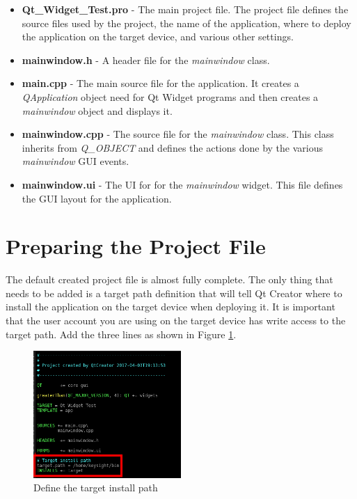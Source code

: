 \documentclass{article}
\begin{document}
\begin{itemize}
	\item \textbf{Qt\_Widget\_Test.pro} - The main project file. The project file defines the source files used by the project, the name of the application, where to deploy the application on the target device, and various other settings.
	
	\item \textbf{mainwindow.h} - A header file for the \textit{mainwindow} class. 
	
	\item \textbf{main.cpp} - The main source file for the application. It creates a \textit{QApplication} object need for Qt Widget programs and then creates a \textit{mainwindow} object and displays it.
	
	\item \textbf{mainwindow.cpp} - The source file for the \textit{mainwindow} class. This class inherits from \textit{Q\_OBJECT} and defines the actions done by the various \textit{mainwindow} GUI events.
	
	\item \textbf{mainwindow.ui} - The UI for for the \textit{mainwindow} widget. This file defines the GUI layout for the application.
\end{itemize}


\section{Preparing the Project File}

The default created project file is almost fully complete. The only thing that needs to be added is a target path definition that will tell Qt Creator where to install the application on the target device when deploying it. It is important that the user account you are using on the target device has write access to the target path. Add the three lines as shown in Figure \ref{Target_Path}.

	\begin{figure}[H]
		\centering
		\includegraphics[width=0.5\textwidth]{pics/Add_Target.png}
		\caption{Define the target install path}
		\label{Target_Path}
	\end{figure}
\end{document}
